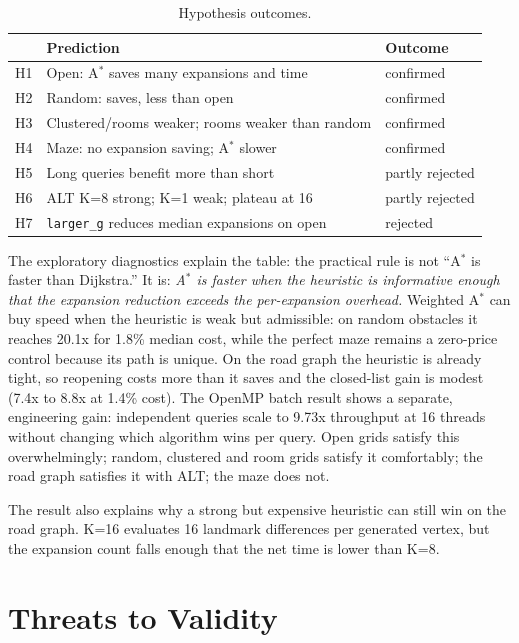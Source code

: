 \documentclass[conference,10pt]{IEEEtran}
\newcommand{\Astar}{A$^\ast$}
\newcommand{\code}[1]{\texttt{#1}}
\begin{document}
\begin{table}[!t]
\centering
\caption{Hypothesis outcomes.}
\label{tab:hyp}
\footnotesize
\setlength{\tabcolsep}{3pt}
\begin{tabular}{p{0.6cm}p{5.5cm}p{1.5cm}}
\toprule
 & Prediction & Outcome\\
\midrule
H1 & Open: \Astar{} saves many expansions and time & confirmed\\
H2 & Random: saves, less than open & confirmed\\
H3 & Clustered/rooms weaker; rooms weaker than random & confirmed\\
H4 & Maze: no expansion saving; \Astar{} slower & confirmed\\
H5 & Long queries benefit more than short & partly rejected\\
H6 & ALT K=8 strong; K=1 weak; plateau at 16 & partly rejected\\
H7 & \code{larger\_g} reduces median expansions on open & rejected\\
\bottomrule
\end{tabular}
\end{table}

The exploratory diagnostics explain the table: the practical rule is not
``\Astar{} is faster than Dijkstra.''  It is: \emph{\Astar{} is faster when
the heuristic is informative enough that the expansion reduction exceeds the
per-expansion overhead.}  Weighted \Astar{} can buy speed when the heuristic
is weak but admissible: on random obstacles it reaches 20.1x for 1.8\% median
cost, while the perfect maze remains a zero-price control because its path is
unique.  On the road graph the heuristic is already tight, so reopening costs
more than it saves and the closed-list gain is modest (7.4x to 8.8x at 1.4\%
cost).  The OpenMP batch result shows a separate, engineering
gain: independent queries scale to 9.73x throughput at 16 threads without
changing which algorithm wins per query.  Open grids satisfy
this overwhelmingly; random, clustered and room grids satisfy it comfortably;
the road graph satisfies it with ALT; the maze does not.

The result also explains why a strong but expensive heuristic can still win on
the road graph.  K=16 evaluates 16 landmark differences per generated vertex,
but the expansion count falls enough that the net time is lower than K=8.

\section{Threats to Validity}
\label{sec:threats}
\end{document}

